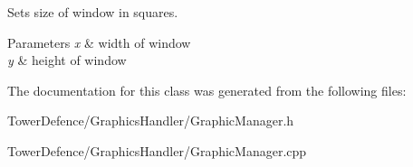 Sets size of window in squares. 


\begin{DoxyParams}{Parameters}
{\em x} & width of window \\
\hline
{\em y} & height of window \\
\hline
\end{DoxyParams}


The documentation for this class was generated from the following files\+:\begin{DoxyCompactItemize}
\item 
Tower\+Defence/\+Graphics\+Handler/Graphic\+Manager.\+h\item 
Tower\+Defence/\+Graphics\+Handler/Graphic\+Manager.\+cpp\end{DoxyCompactItemize}
